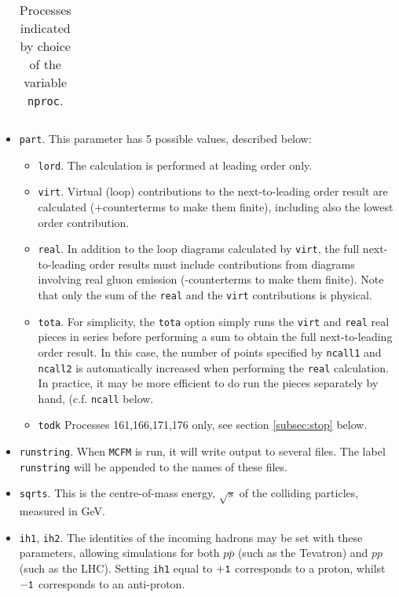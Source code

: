 \documentclass[12pt]{article}
\begin{document}
\begin{itemize}
\begin{table}
\begin{center}
\begin{tabular}{|l|l|l|}
\hline
\end{tabular}
\end{center}
\caption{Processes indicated by choice of the variable {\tt nproc}.\label{nproctable}}

\end{table}

\item {\tt part}.
This parameter has 5 possible values, described below:
\begin{itemize}
\item {\tt lord}.
The calculation is performed at leading order only.
\item {\tt virt}.
Virtual (loop) contributions to the next-to-leading order result are
calculated (+counterterms to make them finite), including also the
lowest order contribution.
\item {\tt real}.
In addition to the loop diagrams calculated by {\tt virt}, the full
next-to-leading order results must include contributions from diagrams
involving real gluon emission (-counterterms to make them finite).
Note that only the sum of the {\tt real} and the {\tt virt} contributions
is physical.
\item {\tt tota}.
For simplicity, the {\tt tota} option simply runs the {\tt virt} and
{\tt real} real pieces in series before performing a sum to obtain
the full next-to-leading order result. In this case, the number of
points specified by {\tt ncall1} and {\tt ncall2} is automatically
increased when performing the {\tt real} calculation. In practice,
it may be more efficient to do run the pieces separately by hand, 
(c.f. {\tt ncall} below.
\item {\tt todk}
Processes 161,166,171,176 only, see section \ref{subsec:stop} below.
\end{itemize}

\item {\tt runstring}.
When {\tt MCFM} is run, it will write output to several files. The
label {\tt runstring} will be appended to the names of these files.

\item {\tt sqrts}. This is the centre-of-mass energy, $\sqrt{s}$ of
the colliding particles, measured in GeV.

\item {\tt ih1}, {\tt ih2}. The identities of the incoming hadrons
may be set with these parameters, allowing simulations for both
$p{\bar p}$ (such as the Tevatron) and $pp$ (such as the LHC). 
Setting {\tt ih1} equal to ${\tt +1}$ corresponds to
a proton, whilst ${\tt -1}$ corresponds to an anti-proton.


\end{itemize}
\end{document}
